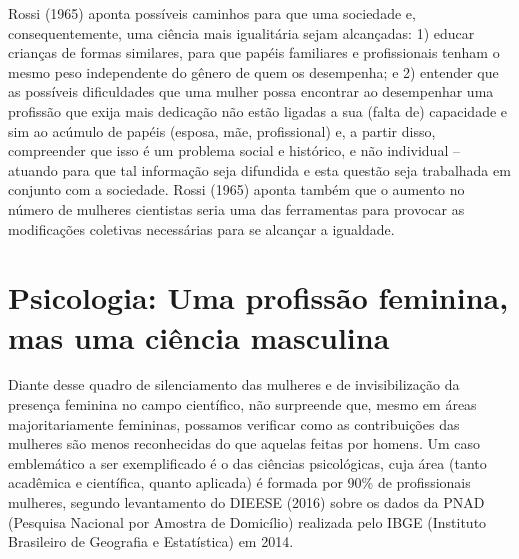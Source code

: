 Rossi (1965) aponta possíveis caminhos para que uma sociedade e, consequentemente, uma ciência mais igualitária sejam alcançadas: 1) educar crianças de formas similares, para que papéis familiares e profissionais tenham o mesmo peso independente do gênero de quem os desempenha; e 2) entender que as possíveis dificuldades que uma mulher possa encontrar ao desempenhar uma profissão que exija mais dedicação não estão ligadas a sua (falta de) capacidade e sim ao acúmulo de papéis (esposa, mãe, profissional) e, a partir disso, compreender que isso é um problema social e histórico, e não individual – atuando para que tal informação seja difundida e esta questão seja trabalhada em conjunto com a sociedade. Rossi (1965) aponta também que o aumento no número de mulheres cientistas seria uma das ferramentas para provocar as modificações coletivas necessárias para se alcançar a igualdade.

\section{Psicologia: Uma profissão feminina, mas uma ciência masculina}

Diante desse quadro de silenciamento das mulheres e de invisibilização da presença feminina no campo científico, não surpreende que, mesmo em áreas majoritariamente femininas, possamos verificar como as contribuições das mulheres são menos reconhecidas do que aquelas feitas por homens. Um caso emblemático a ser exemplificado é o das ciências psicológicas, cuja área (tanto acadêmica e científica, quanto aplicada) é formada por 90\% de profissionais mulheres, segundo levantamento do DIEESE (2016) sobre os dados da PNAD (Pesquisa Nacional por Amostra de Domicílio) realizada pelo IBGE (Instituto Brasileiro de Geografia e Estatística) em 2014.

